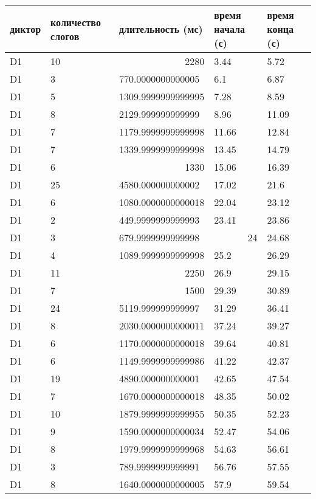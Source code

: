 \begin{longtable}{|l|l|l|l|l|}
\hline
диктор & количество слогов & длительность (мс) & время начала (с) & время конца (с)\\
\hline \endhead
D1 & 10 & \multicolumn{1}{r|}{2280} & 3.44 & 5.72 \\ \hline
D1 & 3 & 770.0000000000005 & 6.1 & 6.87 \\ \hline
D1 & 5 & 1309.9999999999995 & 7.28 & 8.59 \\ \hline
D1 & 8 & 2129.999999999999 & 8.96 & 11.09 \\ \hline
D1 & 7 & 1179.9999999999998 & 11.66 & 12.84 \\ \hline
D1 & 7 & 1339.9999999999998 & 13.45 & 14.79 \\ \hline
D1 & 6 & \multicolumn{1}{r|}{1330} & 15.06 & 16.39 \\ \hline
D1 & 25 & 4580.000000000002 & 17.02 & 21.6 \\ \hline
D1 & 6 & 1080.0000000000018 & 22.04 & 23.12 \\ \hline
D1 & 2 & 449.9999999999993 & 23.41 & 23.86 \\ \hline
D1 & 3 & 679.9999999999998 & \multicolumn{1}{r|}{24} & 24.68 \\ \hline
D1 & 4 & 1089.9999999999998 & 25.2 & 26.29 \\ \hline
D1 & 11 & \multicolumn{1}{r|}{2250} & 26.9 & 29.15 \\ \hline
D1 & 7 & \multicolumn{1}{r|}{1500} & 29.39 & 30.89 \\ \hline
D1 & 24 & 5119.999999999997 & 31.29 & 36.41 \\ \hline
D1 & 8 & 2030.0000000000011 & 37.24 & 39.27 \\ \hline
D1 & 6 & 1170.0000000000018 & 39.64 & 40.81 \\ \hline
D1 & 6 & 1149.9999999999986 & 41.22 & 42.37 \\ \hline
D1 & 19 & 4890.000000000001 & 42.65 & 47.54 \\ \hline
D1 & 7 & 1670.0000000000018 & 48.35 & 50.02 \\ \hline
D1 & 10 & 1879.9999999999955 & 50.35 & 52.23 \\ \hline
D1 & 9 & 1590.0000000000034 & 52.47 & 54.06 \\ \hline
D1 & 8 & 1979.9999999999968 & 54.63 & 56.61 \\ \hline
D1 & 3 & 789.9999999999991 & 56.76 & 57.55 \\ \hline
D1 & 8 & 1640.0000000000005 & 57.9 & 59.54 \\ \hline

\end{longtable}
